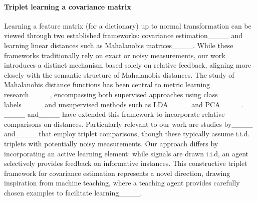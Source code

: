 \paragraph{Triplet learning a covariance matrix}
Learning a feature matrix (for a dictionary) up to normal transformation can be viewed through two established frameworks: covariance estimation____ and learning linear distances such as Mahalanobis matrices____. While these frameworks traditionally rely on exact or noisy measurements, our work introduces a distinct mechanism based solely on relative feedback, aligning more closely with the semantic structure of Mahalanobis distances.
The study of Mahalanobis distance functions has been central to metric learning research____, encompassing both supervised approaches using class labels____ and unsupervised methods such as LDA____ and PCA____. ____ and____ have extended this framework to incorporate relative comparisons on distances. Particularly relevant to our work are studies by____ and____ that employ triplet comparisons, though these typically assume i.i.d. triplets with potentially noisy measurements.
Our approach differs by incorporating an active learning element: while signals are drawn i.i.d, an agent selectively provides feedback on informative instances. This constructive triplet framework for covariance estimation represents a novel direction, drawing inspiration from machine teaching, where a teaching agent provides carefully chosen examples to facilitate learning____.

